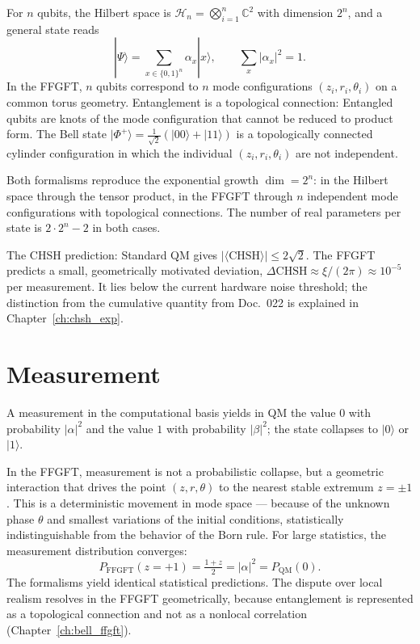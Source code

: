 For $n$ qubits, the Hilbert space is
$\mathcal{H}_n = \bigotimes_{i=1}^n\mathbb{C}^2$ with dimension $2^n$,
and a general state reads
\begin{equation}
  |\Psi\rangle = \sum_{x\in\{0,1\}^n}\alpha_x|x\rangle,\qquad
  \sum_x|\alpha_x|^2 = 1.
\end{equation}
In the FFGFT, $n$ qubits correspond to $n$ mode configurations
$(z_i,r_i,\theta_i)$ on a common torus geometry. Entanglement
is a topological connection: Entangled qubits are knots of the
mode configuration that cannot be reduced to product form.
The Bell state $|\Phi^+\rangle = \frac{1}{\sqrt2}(|00\rangle+|11\rangle)$
is a topologically connected cylinder configuration in which the
individual $(z_i,r_i,\theta_i)$ are not independent.

Both formalisms reproduce the exponential growth $\dim = 2^n$:
in the Hilbert space through the tensor product, in the FFGFT through $n$
independent mode configurations with topological connections. The
number of real parameters per state is $2\cdot2^n-2$ in both cases.

The CHSH prediction: Standard QM gives $|\langle\mathrm{CHSH}\rangle|
\le2\sqrt2$. The FFGFT predicts a small, geometrically motivated deviation,
$\Delta\mathrm{CHSH}\approx\xi/(2\pi)\approx10^{-5}$ per
measurement. It lies below the current hardware noise threshold;
the distinction from the cumulative quantity from Doc.~022 is explained in
Chapter~\ref{ch:chsh_exp}.

\section{Measurement}

A measurement in the computational basis yields in QM the value $0$ with
probability $|\alpha|^2$ and the value $1$ with probability
$|\beta|^2$; the state collapses to $|0\rangle$ or $|1\rangle$.

In the FFGFT, measurement is not a probabilistic collapse, but a
geometric interaction that drives the point $(z,r,\theta)$ to the
nearest stable extremum $z = \pm1$. This is a
deterministic movement in mode space --- because of the unknown phase
$\theta$ and smallest variations of the initial conditions, statistically
indistinguishable from the behavior of the Born rule. For large statistics,
the measurement distribution converges:
\begin{equation}
  P_{\mathrm{FFGFT}}(z = +1) = \tfrac{1+z}{2} = |\alpha|^2 = P_{\mathrm{QM}}(0).
\end{equation}
The formalisms yield identical statistical predictions.
The dispute over local realism resolves in the FFGFT geometrically,
because entanglement is represented as a topological connection and not as a
nonlocal correlation (Chapter~\ref{ch:bell_ffgft}).

